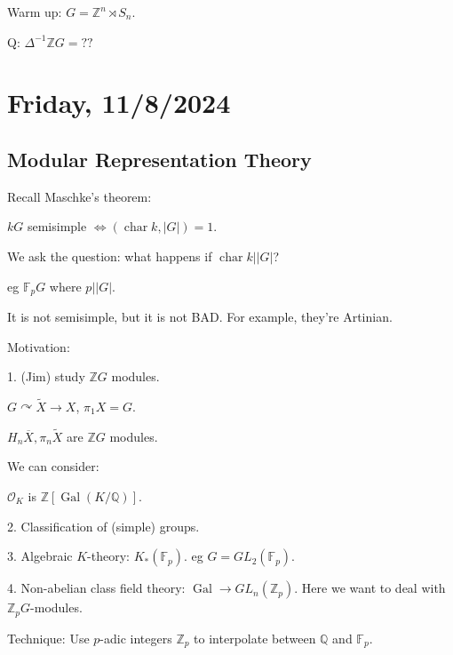 \documentclass{article}
\theoremstyle{definition}
\newcommand{\acts}{\curvearrowright}
\begin{document}
Warm up: \(G = \mathbb{Z}^n \rtimes S_n\).

Q: \(\Delta ^{-1} \mathbb{Z} G = ??\) 

\section*{Friday, 11/8/2024}

\subsection*{Modular Representation Theory}

Recall Maschke's theorem:

\(kG\) semisimple \(\iff (\operatorname{char} k, \vert G \vert)=1\).

We ask the question: what happens if \(\operatorname{char} k \mid \vert G \vert\)?

eg \(\mathbb{F}_p G\) where \(p\mid \vert G \vert\).

It is not semisimple, but it is not BAD. For example, they're Artinian.

Motivation:

1. (Jim) study \(\mathbb{Z} G\) modules.

\(G \acts \widetilde{X}\to X\), \(\pi_1 X = G\).

\(H_n \overline{X}, \pi_n \widetilde{X}\) are \(\mathbb{Z} G\) modules.

We can consider:

\begin{center}
\end{center}

\(\mathcal{O}_K\) is \(\mathbb{Z}[\operatorname{Gal}(K / \mathbb{Q})]\).

2. Classification of (simple) groups.

3. Algebraic \(K\)-theory: \(K_{\ast} (\mathbb{F}_p)\). eg \(G = GL_2(\mathbb{F}_p)\).

4. Non-abelian class field theory: \(\operatorname{Gal} \to GL_n(\mathbb{Z}_p)\). Here we want to deal with \(\mathbb{Z}_p G\)-modules.

Technique: Use \(p\)-adic integers \(\mathbb{Z}_p\) to interpolate between \(\mathbb{Q}\) and \(\mathbb{F}_p\).
\end{document}
